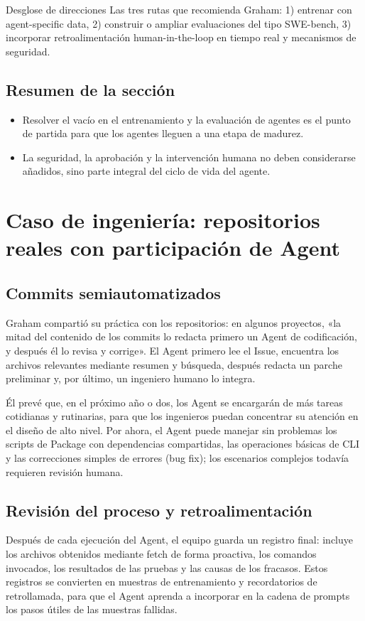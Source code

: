 \documentclass[a4paper]{article}
\begin{document}
\begin{importantbox}{Desglose de direcciones}
Las tres rutas que recomienda Graham: 1) entrenar con agent-specific data, 2) construir o ampliar evaluaciones del tipo SWE-bench, 3) incorporar retroalimentación human-in-the-loop en tiempo real y mecanismos de seguridad.
\end{importantbox}

\subsection{Resumen de la sección}
\begin{itemize}
    \item Resolver el vacío en el entrenamiento y la evaluación de agentes es el punto de partida para que los agentes lleguen a una etapa de madurez.
    \item La seguridad, la aprobación y la intervención humana no deben considerarse añadidos, sino parte integral del ciclo de vida del agente.
\end{itemize}
\section{Caso de ingeniería: repositorios reales con participación de Agent}
\subsection{Commits semiautomatizados}
Graham compartió su práctica con los repositorios: en algunos proyectos, «la mitad del contenido de los commits lo redacta primero un Agent de codificación, y después él lo revisa y corrige». El Agent primero lee el Issue, encuentra los archivos relevantes mediante resumen y búsqueda, después redacta un parche preliminar y, por último, un ingeniero humano lo integra.

Él prevé que, en el próximo año o dos, los Agent se encargarán de más tareas cotidianas y rutinarias, para que los ingenieros puedan concentrar su atención en el diseño de alto nivel. Por ahora, el Agent puede manejar sin problemas los scripts de Package con dependencias compartidas, las operaciones básicas de CLI y las correcciones simples de errores (bug fix); los escenarios complejos todavía requieren revisión humana.

\subsection{Revisión del proceso y retroalimentación}
Después de cada ejecución del Agent, el equipo guarda un registro final: incluye los archivos obtenidos mediante fetch de forma proactiva, los comandos invocados, los resultados de las pruebas y las causas de los fracasos. Estos registros se convierten en muestras de entrenamiento y recordatorios de retrollamada, para que el Agent aprenda a incorporar en la cadena de prompts los pasos útiles de las muestras fallidas.
\end{document}
